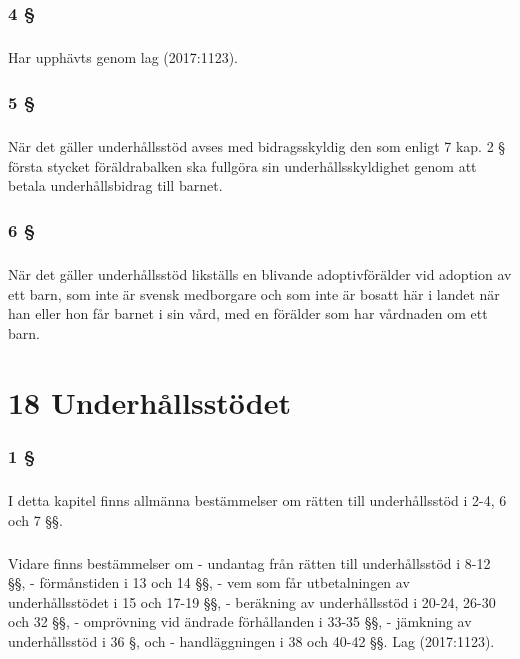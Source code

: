 \documentclass[a4paper,notitlepage,openany,10pt]{book}
\begin{document}
\subsection*{4 §}
\paragraph*{}
Har upphävts genom
lag (2017:1123).
\subsection*{5 §}
\paragraph*{}
När det gäller underhållsstöd avses med bidragsskyldig den som enligt 7 kap. 2 § första stycket föräldrabalken ska fullgöra sin underhållsskyldighet genom att betala underhållsbidrag till barnet.
\subsection*{6 §}
\paragraph*{}
När det gäller underhållsstöd likställs en blivande adoptivförälder vid adoption av ett barn, som inte är svensk medborgare och som inte är bosatt här i landet när han eller hon får barnet i sin vård, med en förälder som har vårdnaden om ett barn.
\chapter*{18 Underhållsstödet}
\subsection*{1 §}
\paragraph*{}
I detta kapitel finns allmänna bestämmelser om rätten till underhållsstöd i 2-4, 6 och 7 §§.
\paragraph*{}
Vidare finns bestämmelser om
\newline - undantag från rätten till underhållsstöd i 8-12 §§,
\newline - förmånstiden i 13 och 14 §§,
\newline - vem som får utbetalningen av underhållsstödet i 15 och 17-19 §§,
\newline - beräkning av underhållsstöd i 20-24, 26-30 och 32 §§,
\newline - omprövning vid ändrade förhållanden i 33-35 §§,
\newline - jämkning av underhållsstöd i 36 §, och
\newline - handläggningen i 38 och 40-42 §§.
Lag (2017:1123).
\end{document}
